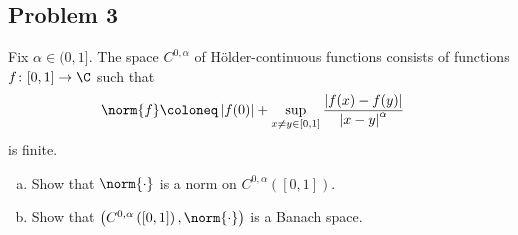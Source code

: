 \documentclass[10pt]{mypackage}
\begin{document}
\subsection{Problem 3}%
\begin{problem}
  Fix $\alpha\in (0,1]$. The space $C^{0,\alpha}$ of Hölder-continuous functions consists of functions $f\colon [0,1]\rightarrow \C$ such that
  \begin{align*}
    \norm{f} &\coloneq \left\vert f(0) \right\vert + \sup_{x\neq y\in [0,1]} \frac{\left\vert f(x)-f(y) \right\vert}{\left\vert x-y \right\vert^{\alpha}}
  \end{align*}
  is finite.
  \begin{enumerate}[(a)]
    \item Show that $\norm{\cdot}$ is a norm on $C^{0,\alpha}\left( [0,1] \right)$.
    \item Show that $\left( C^{0,\alpha}\left( [0,1] \right),\norm{\cdot} \right)$ is a Banach space.
  \end{enumerate}
\end{problem}
\end{document}
